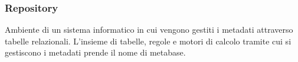 
\subsubsection*{Repository}
Ambiente di un sistema informatico in cui vengono gestiti i metadati attraverso
tabelle relazionali. L'insieme di tabelle, regole e motori di calcolo tramite
cui si gestiscono i metadati prende il nome di metabase.

\newpage
